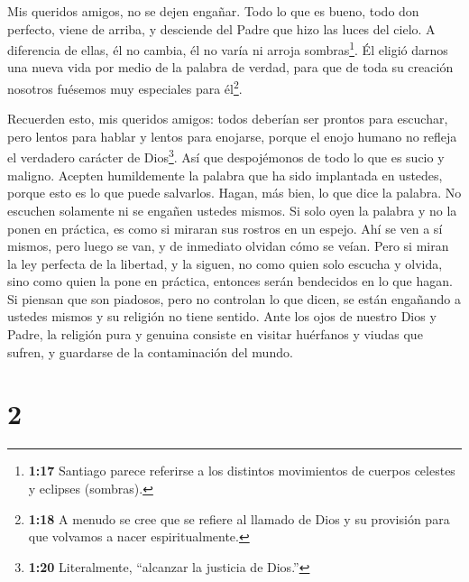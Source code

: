  Mis queridos amigos, no se dejen engañar. 
Todo lo que es bueno, todo don perfecto, viene de arriba, y desciende
del Padre que hizo las luces del cielo. A diferencia de ellas, él no
cambia, él no varía ni arroja sombras\footnote{\textbf{1:17} Santiago
  parece referirse a los distintos movimientos de cuerpos celestes y
  eclipses (sombras).}.  Él eligió darnos una nueva vida
por medio de la palabra de verdad, para que de toda su creación nosotros
fuésemos muy especiales para él\footnote{\textbf{1:18} A menudo se cree
  que se refiere al llamado de Dios y su provisión para que volvamos a
  nacer espiritualmente.}.

 Recuerden esto, mis queridos amigos: todos deberían ser
prontos para escuchar, pero lentos para hablar y lentos para enojarse,
 porque el enojo humano no refleja el verdadero carácter de
Dios\footnote{\textbf{1:20} Literalmente, ``alcanzar la justicia de
  Dios.''}.  Así que despojémonos de todo lo que es sucio y
maligno. Acepten humildemente la palabra que ha sido implantada en
ustedes, porque esto es lo que puede salvarlos.  Hagan, más
bien, lo que dice la palabra. No escuchen solamente ni se engañen
ustedes mismos.  Si solo oyen la palabra y no la ponen en
práctica, es como si miraran sus rostros en un espejo.  Ahí
se ven a sí mismos, pero luego se van, y de inmediato olvidan cómo se
veían.  Pero si miran la ley perfecta de la libertad, y la
siguen, no como quien solo escucha y olvida, sino como quien la pone en
práctica, entonces serán bendecidos en lo que hagan.  Si
piensan que son piadosos, pero no controlan lo que dicen, se están
engañando a ustedes mismos y su religión no tiene sentido. 
Ante los ojos de nuestro Dios y Padre, la religión pura y genuina
consiste en visitar huérfanos y viudas que sufren, y guardarse de la
contaminación del mundo.

\hypertarget{section-1}{%
\section{2}\label{section-1}}

